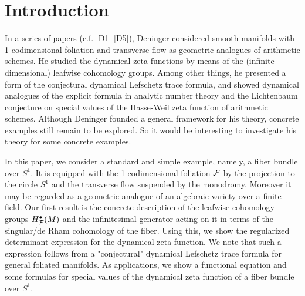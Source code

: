 \section*{Introduction}

In a series of papers (c.f. [D1]-[D5]), Deninger considered smooth manifolds with 1-codimensional foliation and transverse flow as geometric analogues of arithmetic schemes.
He studied the dynamical zeta functions by means of the (infinite dimensional) leafwise cohomology groups.
Among other things, he presented a form of the conjectural dynamical Lefschetz trace formula, and showed dynamical analogues of the explicit formula in analytic number theory and the Lichtenbaum conjecture on special values of the Hasse-Weil zeta function of arithmetic schemes.
Although Deninger founded a general framework for his theory, concrete examples still remain to be explored.
So it would be interesting to investigate his theory for some concrete examples.

In this paper, we consider a standard and simple example, namely, a fiber bundle over $S^{1}$.
It is equipped with the 1-codimensional foliation ${\mathcal{F}}$ by the projection to the circle $S^{1}$ and the transverse flow suspended by the monodromy.
Moreover it may be regarded as a geometric analogue of an algebraic variety over a finite field. 
Our first result is the concrete description of the leafwise cohomology groups $H_{{\mathcal{F}}}^{\bullet}(M)$ and the infinitesimal generator acting on it in terms of the singular/de Rham cohomology of the fiber.
Using this, we show the regularized determinant expression for the dynamical zeta function. We note that such a expression follows from a "conjectural" dynamical Lefschetz trace formula for general foliated manifolds.
As applications, we show a functional equation and some formulas for special values of the dynamical zeta function of a fiber bundle over $S^{1}$.